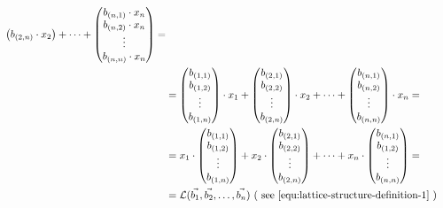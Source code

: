 \documentclass[runningheads]{llncs}
\numberwithin{equation}{section}
\begin{document}
\begin{equation}
\begin{split}
\begin{pmatrix}
                {b}_{(2, n)} \cdot {x}_{2}
            \end{pmatrix} + \dots +
            \begin{pmatrix}
                {b}_{(n, 1)} \cdot {x}_{n} \\
                {b}_{(n, 2)} \cdot {x}_{n} \\
                \vdots \\
                {b}_{(n, n)} \cdot {x}_{n}
            \end{pmatrix} = \\
            & = \begin{pmatrix}
                {b}_{(1, 1)} \\
                {b}_{(1, 2)} \\
                \vdots \\
                {b}_{(1, n)}
            \end{pmatrix} \cdot {x}_{1} + 
            \begin{pmatrix}
                {b}_{(2, 1)} \\
                {b}_{(2, 2)} \\
                \vdots \\
                {b}_{(2, n)}
            \end{pmatrix} \cdot {x}_{2}+ \dots +
            \begin{pmatrix}
                {b}_{(n, 1)} \\
                {b}_{(n, 2)} \\
                \vdots \\
                {b}_{(n, n)}
            \end{pmatrix} \cdot {x}_{n} = \\
            & = {x}_{1} \cdot
            \begin{pmatrix} 
                {b}_{(1, 1)} \\ {b}_{(1, 2)} \\ \vdots \\ {b}_{(1, n)}
            \end{pmatrix}
            + {x}_{2} \cdot
            \begin{pmatrix} 
                {b}_{(2, 1)} \\ {b}_{(2, 2)} \\ \vdots \\ {b}_{(2, n)}
            \end{pmatrix}
            + \dots + {x}_{n} \cdot
            \begin{pmatrix}
                {b}_{(n, 1)} \\ {b}_{(1, 2)} \\ \vdots \\ {b}_{(n, n)}
            \end{pmatrix} = \\
            & = \mathcal{L}(\Vec{{b}_{1}}, \Vec{{b}_{2}}, \dots, \Vec{{b}_{n}}) \text{ (\ see \Cref{equ:lattice-structure-definition-1} )\ }
        \end{split}
        \label{equ:lattice-structure-definition-2}
    \end{equation}
    \vspace{1ex}
\end{document}
